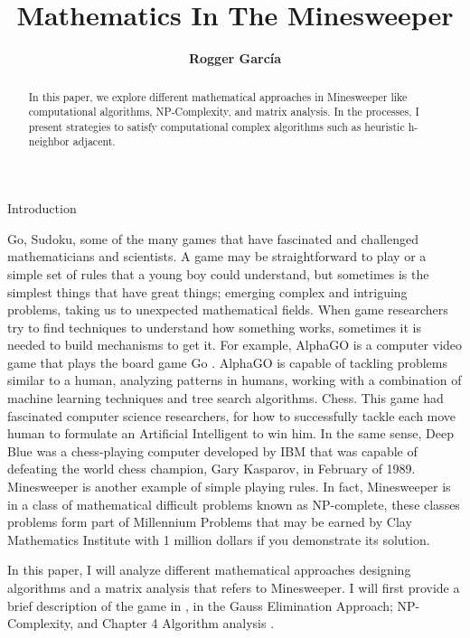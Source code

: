 \documentclass[a4paper]{article}
\title{\textbf{Mathematics In The Minesweeper}}
\author{\textbf{Rogger García}}
\numberwithin{equation}{subsection}
\begin{document}
\maketitle

\begin{abstract}
In this paper, we explore different mathematical approaches in Minesweeper like computational algorithms, NP-Complexity, and matrix analysis. In the processes, I present strategies to satisfy computational complex algorithms such as heuristic h-neighbor adjacent.
\end{abstract}


{\huge Introduction}



\vspace{5mm} %

Go, Sudoku, some of the many games that have fascinated and challenged mathematicians and scientists.  A game may be straightforward to play or a simple set of rules that a young boy could understand, but sometimes is the simplest things that have great things; emerging complex and intriguing problems, taking us to unexpected mathematical fields.
When game researchers try to find techniques to understand how something works, sometimes it is needed to build mechanisms to get it. For example, AlphaGO is a computer video game that plays the board game Go .  AlphaGO is capable of tackling problems similar to a human, analyzing patterns in humans, working with a combination of machine learning techniques and tree search algorithms.
Chess. This game had fascinated computer science researchers, for how to successfully tackle each move human to formulate an Artificial Intelligent to win him. In the same sense, Deep Blue was a chess-playing computer developed by IBM that was capable of defeating the world chess champion, Gary Kasparov, in February of 1989.
Minesweeper is another example of simple playing rules. In fact,  Minesweeper is in a class of mathematical difficult problems known as NP-complete, these classes problems form part of Millennium Problems that may be earned by Clay Mathematics Institute with 1 million dollars if you demonstrate its solution.

\vspace{5mm} %
In this paper, I will analyze different mathematical approaches designing algorithms and a matrix analysis that refers to Minesweeper. I will first provide a brief description of the game in , in the  Gauss Elimination Approach;   NP-Complexity, and Chapter 4 Algorithm analysis . 
\end{document}
